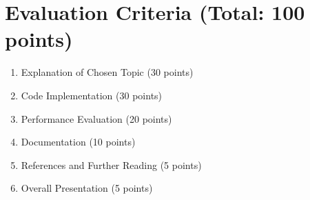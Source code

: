 \documentclass{article}
\begin{document}
\section*{Evaluation Criteria (Total: 100 points)}
\begin{enumerate}[label=\arabic*.]
    \item Explanation of Chosen Topic (30 points)
    \item Code Implementation (30 points)
    \item Performance Evaluation (20 points)
    \item Documentation (10 points)
    \item References and Further Reading (5 points)
    \item Overall Presentation (5 points)
\end{enumerate}
\end{document}
